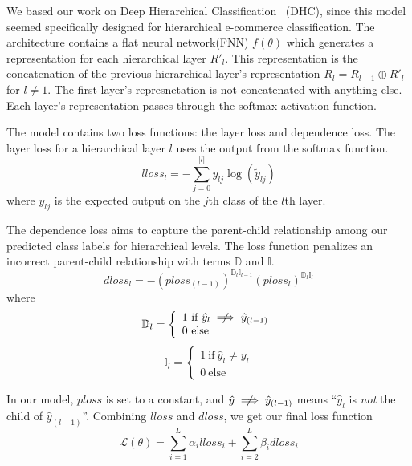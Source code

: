\documentclass[conference]{IEEEtran}
\begin{document}
We based our work on Deep Hierarchical Classification~\cite{gao2020deep} (DHC), since this model seemed 
specifically designed for hierarchical e-commerce classification.
The architecture contains a flat neural network(FNN) $f(\theta)$ which generates a representation 
for each hierarchical layer $R'_l$. 
This representation is the concatenation of the previous hierarchical layer's representation
$R_l = R_{l-1}\oplus R'_l$ for $ l\neq 1$. 
The first layer's represnetation is not concatenated with anything else.
Each layer's representation passes through the softmax activation function.

The model contains two loss functions: the layer loss and dependence loss.
The layer loss for a hierarchical layer $l$ uses the output from the softmax 
function. 
\begin{equation}
		lloss_l = -\sum_{j=0}^{|l|} y_{lj} \log (\tilde{y}_{lj})
		\label{eq:lloss}
\end{equation}
where $y_{lj}$ is the expected output on the $j$th class of the $l$th layer.

The dependence loss aims to capture the parent-child relationship among our predicted class labels
for hierarchical levels.
The loss function penalizes an incorrect parent-child relationship with terms $\mathbb{D}$ and $\mathbb{I}$.
\begin{equation}
		dloss_l = -(ploss_{(l-1)})^{\mathbb{D}_{l}\mathbb{I}_{l-1}}(ploss_l)^{\mathbb{D}_l\mathbb{I}_l}
\end{equation}
where
\begin{equation*}
	\mathbb{D}_l = \left\{
			\begin{array}{ll}
					1~\textrm{if}~\hat{y}_l\centernot\implies \hat{y}_{(l-1)} \\ 
					0~\textrm{else}
			\end{array}
			\right.
			\label{eq:d}
\end{equation*}
\begin{equation*}
	\mathbb{I}_l = \left\{
			\begin{array}{ll}
				1~\textrm{if}~\hat{y}_l\neq y_l \\
				0~\textrm{else}
			\end{array}
			\right.
			\label{eq:i}
\end{equation*}

In our model, $ploss$ is set to a constant, and $\hat{y}\centernot\implies\hat{y}_{(l-1)}$ means
``$\hat{y}_l$ is \emph{not} the child of $\hat{y}_{(l-1)}$''.
Combining $lloss$ and $dloss$, we get our final loss function
\begin{equation}
		\mathcal{L}(\theta) = \sum_{i=1}^{L}\alpha_i lloss_i + \sum_{i=2}^{L}\beta_i dloss_{i}
		\label{eq:loss}
\end{equation}
\end{document}
